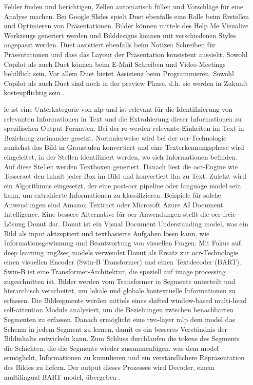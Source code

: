 Fehler finden und berichtigen, Zellen automatisch füllen und Vorschläge für eine Analyse machen. Bei Google Slides spielt Duet ebenfalls eine Rolle beim Erstellen und Optimieren von Präsentationen. Bilder können mittels des Help Me Visualize Werkzeugs generiert werden und Bilddesigns können mit verschiedenen Styles angepasst werden. Duet assistiert ebenfalls beim Notizen Schreiben für Präsentationen und dass das Layout der Präsentation konsistent aussieht. Sowohl Copilot als auch Duet können beim E-Mail Schreiben und Video-Meetings behilflich sein. Vor allem Duet bietet Assistenz beim Programmieren. Sowohl Copilot als auch Duet sind noch in der preview Phase, d.h. sie werden in Zukunft kostenpflichtig sein \cite{copilot-duet}. 

\gls{ie} ist eine Unterkategorie von \gls{nlp} und ist relevant für die Identifizierung von relevanten Informationen in Text und die Extrahierung dieser Informationen zu spezifischen Output-Formaten. Bei der \gls{re} werden relevante Einheiten im Text in Beziehung zueinander gesetzt. Normalerweise wird bei der \gls{ocr}-Technologie zunächst das Bild in Graustufen konvertiert und eine Texterkennungsphase wird eingeleitet, in der Stellen identifiziert werden, wo sich Informationen befinden. Auf diese Stellen werden Textboxen generiert. Danach liest die \gls{ocr}-Engine wie Tesseract den Inhalt jeder Box im Bild und konvertiert ihn zu Text. Zuletzt wird ein Algorithmus eingesetzt, der eine post-\gls{ocr} pipeline oder language model sein kann, um extrahierte Informationen zu klassifizieren. Beispiele für solche Anwendungen sind Amazon Textract oder Microsoft Azure AI Document Intelligence. Eine bessere Alternative für \gls{ocr}-Anwendungen stellt die \gls{ocr}-freie Lösung Donut dar. Donut ist ein Visual Document Understanding model, was ein Bild als input aktzeptiert und textbasierte Aufgaben lösen kann, wie Informationsgewinnung und Beantwortung von visuellen Fragen. Mit Fokus auf deep learning img2seq models verwendet Donut als Ersatz zur \gls{ocr}-Technologie einen visuellen Encoder (Swin-B Transformer) und einen Textdecoder (BART). Swin-B ist eine Transformer-Architektur, die speziell auf image processing zugeschnitten ist. Bilder werden vom Transformer in Segmente unterteilt und hierarchisch verarbeitet, um lokale und globale kontextuelle Informationen zu erfassen. Die Bildsegmente werden mittels eines shifted window-based multi-head self-attention Moduls analysiert, um die Beziehungen zwischen benachbarten Segmenten zu erfassen. Danach ermöglicht eine two-layer \gls{mlp} dem model das Schema in jedem Segment zu lernen, damit es ein besseres Verständnis der Bildinhalts entwickeln kann. Zum Schluss durchlaufen die tokens des Segments die Schichten, die die Segmente wieder zusammenfügen, was dem model ermöglicht, Informationen zu kumulieren und ein verständlichere Repräsentation des Bildes zu liefern. Der output dieses Prozesses wird Decoder, einem multilingual BART model, übergeben \cite{transformers-ocr}. \\

